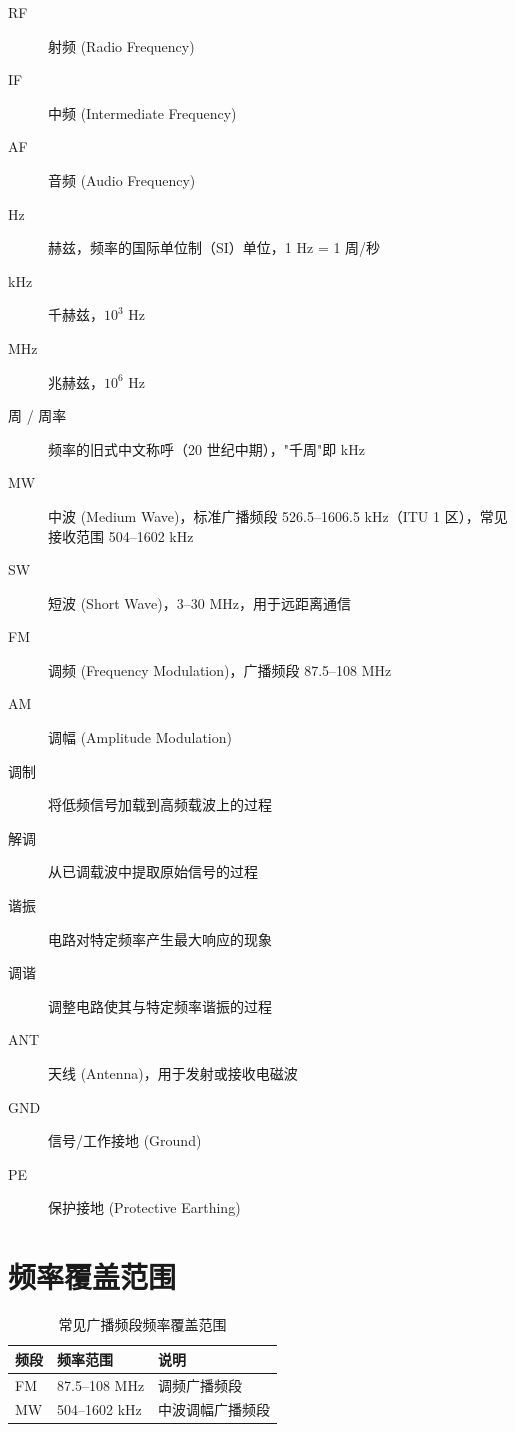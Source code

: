 \begin{description}
    \item[RF] 射频 (Radio Frequency)
    \item[IF] 中频 (Intermediate Frequency)
    \item[AF] 音频 (Audio Frequency)
    \item[Hz] 赫兹，频率的国际单位制（SI）单位，1 Hz = 1 周/秒
    \item[kHz] 千赫兹，$10^3$ Hz
    \item[MHz] 兆赫兹，$10^6$ Hz
    \item[周 / 周率] 频率的旧式中文称呼（20 世纪中期），"千周"即 kHz
    \item[MW] 中波 (Medium Wave)，标准广播频段 526.5–1606.5 kHz（ITU 1 区），常见接收范围 504–1602 kHz
    \item[SW] 短波 (Short Wave)，3–30 MHz，用于远距离通信
    \item[FM] 调频 (Frequency Modulation)，广播频段 87.5–108 MHz
    \item[AM] 调幅 (Amplitude Modulation)
    \item[调制] 将低频信号加载到高频载波上的过程
    \item[解调] 从已调载波中提取原始信号的过程
    \item[谐振] 电路对特定频率产生最大响应的现象
    \item[调谐] 调整电路使其与特定频率谐振的过程
    \item[ANT] 天线 (Antenna)，用于发射或接收电磁波
    \item[GND] 信号/工作接地 (Ground)
    \item[PE] 保护接地 (Protective Earthing)
\end{description}

\section{频率覆盖范围}

\begin{table}[h]
    \centering
    \caption{常见广播频段频率覆盖范围}
    \begin{tabular}{lll}
        \hline
        \textbf{频段} & \textbf{频率范围} & \textbf{说明} \\
        \hline
        FM & 87.5–108 MHz & 调频广播频段 \\
        MW & 504–1602 kHz & 中波调幅广播频段 \\
        \hline
    \end{tabular}
    \label{tab:broadcast_bands}
\end{table}

